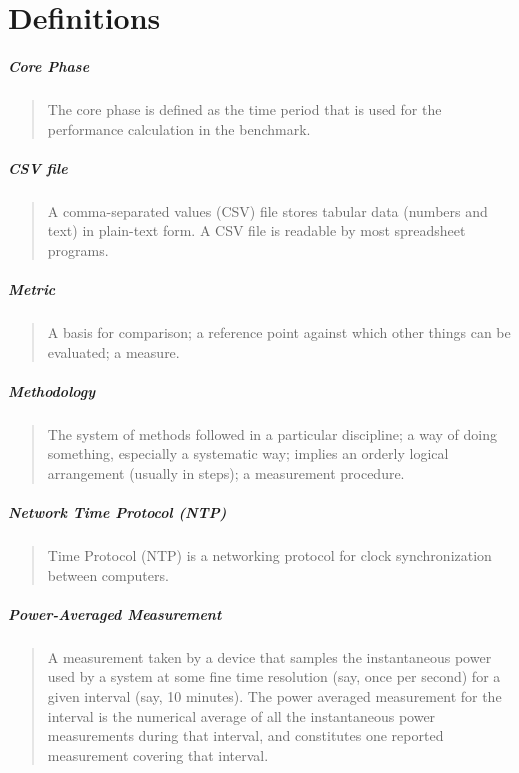 \chapter{Definitions}
\label{sec:definitions}

\setlength{\parskip}{1pt}
\paragraph*{Core Phase}
\begin{quote}
The core phase is defined as the time period that is used for the performance calculation in the benchmark.
\end{quote}

\paragraph*{CSV file}
\begin{quote}
A comma-separated values (CSV) file stores tabular data (numbers and text) in plain-text form. A CSV file is readable by most spreadsheet programs.
\end{quote}

\paragraph*{Metric}
\begin{quote}
A basis for comparison; a reference point against which other things can be evaluated; a measure.
\end{quote}

\paragraph*{Methodology}
\begin{quote}
The system of methods followed in a particular discipline; a way of doing something, especially a systematic way; implies an orderly logical arrangement (usually in steps); a measurement procedure.
\end{quote}


\paragraph*{Network Time Protocol (NTP)}
\begin{quote}
Time Protocol (NTP) is a networking protocol for clock synchronization between computers.
\end{quote}

\paragraph*{Power-Averaged Measurement}
\begin{quote}
A measurement taken by a device that samples the instantaneous power used by a system at some fine
time resolution (say, once per second) for a given interval (say, 10 minutes).  The power averaged
measurement for the interval is the numerical average of all the instantaneous power measurements
during that interval, and constitutes one reported measurement covering that interval.
\end{quote}

